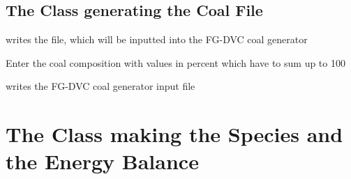 \documentclass[letterpaper,10pt,english]{sphinxmanual}
\begin{document}
\subsection{The Class generating the Coal File}
\label{FGDVCClasses:the-class-generating-the-coal-file}

\begin{fulllineitems}
\label{FGDVCClasses:InformationFiles.WriteFGDVCCoalFile}
writes the file, which will be inputted into the FG-DVC coal generator

\begin{fulllineitems}
\label{FGDVCClasses:InformationFiles.WriteFGDVCCoalFile.setCoalComp}
Enter the coal composition with values in percent which have to sum up to 100

\end{fulllineitems}


\begin{fulllineitems}
\label{FGDVCClasses:InformationFiles.WriteFGDVCCoalFile.write}
writes the FG-DVC coal generator input file

\end{fulllineitems}


\end{fulllineitems}



\section{The Class making the Species and the Energy Balance}
\label{FGDVCClasses:the-class-making-the-species-and-the-energy-balance}
\end{document}
